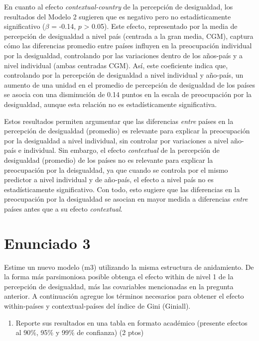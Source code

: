 \documentclass[
  12pt,
  a4paper,
]{article}
\providecommand{\tightlist}{%
  \setlength{\itemsep}{0pt}\setlength{\parskip}{0pt}}
\begin{document}
En cuanto al efecto \emph{contextual-country} de la percepción de desigualdad, los resultados del Modelo 2 sugieren que es negativo pero no estadísticamente significativo (\(\beta\) = -0.14, \(p\) \textgreater{} 0.05). Este efecto, representado por la media de percepción de desigualdad a nivel país (centrada a la gran media, CGM), captura cómo las diferencias promedio entre países influyen en la preocupación individual por la desigualdad, controlando por las variaciones dentro de los años-país y a nivel individual (ambas centradas CGM). Así, este coeficiente indica que, controlando por la percepción de desigualdad a nivel individual y año-país, un aumento de una unidad en el promedio de percepción de desigualdad de los países se asocia con una disminución de 0.14 puntos en la escala de preocupación por la desigualdad, aunque esta relación no es estadísticamente significativa.

Estos resultados permiten argumentar que las diferencias \emph{entre} países en la percepción de desigualdad (promedio) es relevante para explicar la preocupación por la desigualdad a nivel individual, sin controlar por variaciones a nivel año-país e individual. Sin embargo, el efecto \emph{contextual} de la percepción de desigualdad (promedio) de los países no es relevante para explicar la preocupación por la deisgualdad, ya que cuando se controla por el mismo predictor a nivel individual y de año-país, el efecto a nivel país no es estadísticamente significativo. Con todo, esto sugiere que las diferencias en la preocupación por la desigualdad se asocian en mayor medida a diferencias \emph{entre} países antes que a su efecto \emph{contextual}.

\hypertarget{enunciado-3}{%
\section{Enunciado 3}\label{enunciado-3}}

Estime un nuevo modelo (m3) utilizando la misma estructura de anidamiento. De la forma más parsimoniosa posible obtenga el efecto within de nivel 1 de la percepción de desigualdad, más las covariables mencionadas en la pregunta anterior. A continuación agregue los términos necesarios para obtener el efecto within-países y contextual-países del índice de Gini (Giniall).

\begin{enumerate}
\def\labelenumi{\alph{enumi})}
\tightlist
\item
  Reporte sus resultados en una tabla en formato académico (presente efectos al 90\%, 95\% y 99\% de confianza) (2 ptos)
\end{enumerate}
\end{document}
